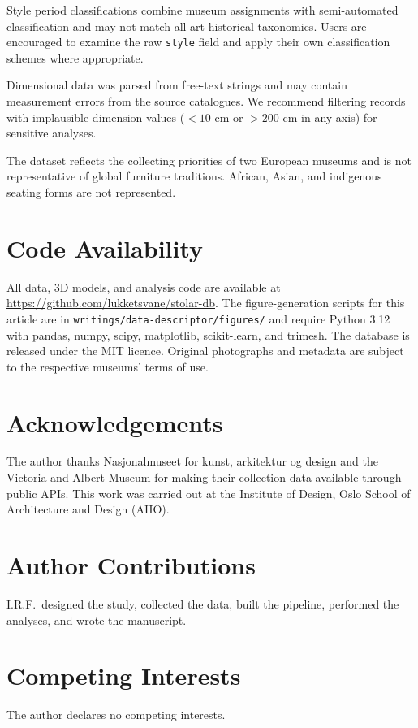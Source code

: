 Style period classifications combine museum assignments
with semi-automated classification and may not match
all art-historical taxonomies.
Users are encouraged to examine the raw \texttt{style} field
and apply their own classification schemes where appropriate.

Dimensional data was parsed from free-text strings
and may contain measurement errors from the source catalogues.
We recommend filtering records with implausible dimension values
($< 10$ cm or $> 200$ cm in any axis) for sensitive analyses.

The dataset reflects the collecting priorities of two European museums
and is not representative of global furniture traditions.
African, Asian, and indigenous seating forms are not represented.


\section{Code Availability}

All data, 3D models, and analysis code are available at
\url{https://github.com/lukketsvane/stolar-db}.
The figure-generation scripts for this article are in
\texttt{writings/data-descriptor/figures/}
and require Python 3.12 with pandas, numpy, scipy,
matplotlib, scikit-learn, and trimesh.
The database is released under the MIT licence.
Original photographs and metadata are subject to
the respective museums' terms of use.


\section*{Acknowledgements}

The author thanks Nasjonalmuseet for kunst, arkitektur og design
and the Victoria and Albert Museum for making their collection data
available through public APIs.
This work was carried out at the Institute of Design,
Oslo School of Architecture and Design (AHO).

\section*{Author Contributions}

I.R.F.\ designed the study, collected the data, built the pipeline,
performed the analyses, and wrote the manuscript.

\section*{Competing Interests}

The author declares no competing interests.





